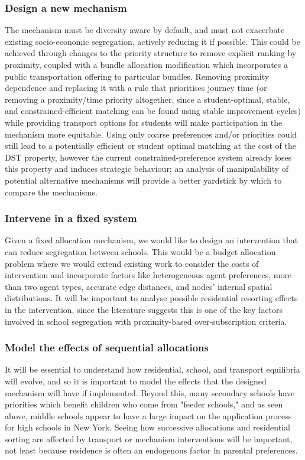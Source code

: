 \documentclass{article}
\begin{document}
\begin{multicols}{2}
\subsubsection{Design a new mechanism}
The mechanism must be diversity aware by default, and must not exacerbate existing socio-economic segregation, actively reducing it if possible. This could be achieved through changes to the priority structure to remove explicit ranking by proximity, coupled with a bundle allocation modification which incorporates a public transportation offering to particular bundles. Removing proximity dependence and replacing it with a rule that prioritises journey time (or removing a proximity/time priority altogether, since a student-optimal, stable, and constrained-efficient matching can be found using stable improvement cycles) while providing transport options for students will make participation in the mechanism more equitable. Using only coarse preferences and/or priorities could still lead to a potentially efficient or student optimal matching at the cost of the DST property, however the current constrained-preference system already loses this property and induces strategic behaviour; an analysis of manipulability of potential alternative mechanisms will provide a better yardstick by which to compare the mechanisms.

\subsubsection{Intervene in a fixed system}
Given a fixed allocation mechanism, we would like to design an intervention that can reduce segregation between schools. This would be a budget allocation problem where we would extend existing work to consider the costs of intervention and incorporate factors like heterogeneous agent preferences, more than two agent types, accurate edge distances, and nodes' internal spatial distributions. It will be important to analyse possible residential resorting effects in the intervention, since the literature suggests this is one of the key factors involved in school segregation with proximity-based over-subscription criteria. 

\subsubsection{Model the effects of sequential allocations}
It will be essential to understand how residential, school, and transport equilibria will evolve, and so it is important to model the effects that the designed mechanism will have if implemented. Beyond this, many secondary schools have priorities which benefit children who come from "feeder schools," and as seen above, middle schools appear to have a large impact on the application process for high schools in New York. Seeing how successive allocations and residential sorting are affected by transport or mechanism interventions will be important, not least because residence is often an endogenous factor in parental preferences.



\end{multicols}
\end{document}
